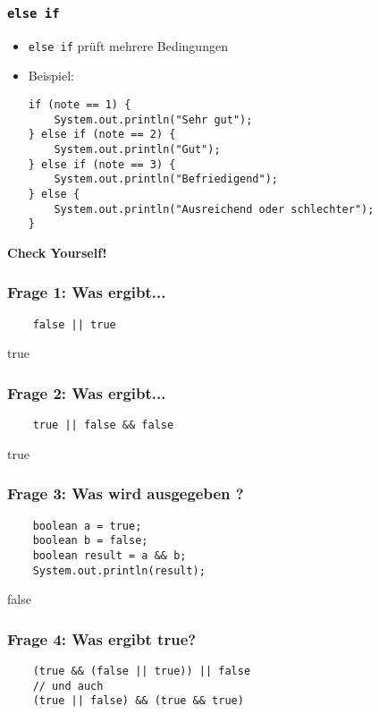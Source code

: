 \documentclass{../../presentation}
\begin{document}
\begin{frame}[fragile]
  \frametitle{\texttt{else if}}
  \pause
  \begin{itemize}
    \item \texttt{else if} prüft mehrere Bedingungen
          \pause
    \item Beispiel:
          \begin{verbatim}
if (note == 1) {
    System.out.println("Sehr gut");
} else if (note == 2) {
    System.out.println("Gut");
} else if (note == 3) {
    System.out.println("Befriedigend");
} else {
    System.out.println("Ausreichend oder schlechter");
} 
    \end{verbatim}
  \end{itemize}
\end{frame}

\begin{frame}[plain]
  \centering
  {\Huge\bfseries{Check Yourself!}}
\end{frame}

\begin{frame}[fragile]
  \frametitle{Frage 1: Was ergibt...}
  \begin{verbatim}
    false || true
  \end{verbatim}
  \pause
  \begin{ausgabe}
    true
  \end{ausgabe}
\end{frame}

\begin{frame}[fragile]
  \frametitle{Frage 2: Was ergibt...}
  \begin{verbatim}
    true || false && false
  \end{verbatim}
  \pause
  \begin{ausgabe}
    true
  \end{ausgabe}
\end{frame}

\begin{frame}[fragile]
  \frametitle{Frage 3: Was wird ausgegeben ?}
  \begin{verbatim}
    boolean a = true;
    boolean b = false;
    boolean result = a && b;
    System.out.println(result);
  \end{verbatim}
  \pause
  \begin{ausgabe}
    false
  \end{ausgabe}
\end{frame}

\begin{frame}[fragile]
  \frametitle{Frage 4: Was ergibt true?}
  \pause
  \begin{verbatim}
    (true && (false || true)) || false
    // und auch 
    (true || false) && (true && true)
  \end{verbatim}
\end{frame}
\end{document}
